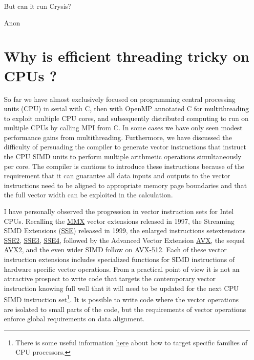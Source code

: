 \epigraph{But can it run Crysis?}{Anon}

\minitoc


\section{Why is efficient threading tricky on CPUs ?}

So far we have almost exclusively focused on programming central processing units (CPU) in serial with C, then with OpenMP annotated C for multithreading to exploit multiple CPU cores, and subsequently distributed computing to run on multiple CPUs by calling MPI from C. In some cases we have only seen modest performance gains from multithreading. Furthermore, we have discussed the difficulty of persuading the compiler to generate vector instructions that instruct the CPU SIMD units to perform multiple arithmetic operations simultaneously per core.  The compiler is cautious to introduce these instructions because of the requirement that it can guarantee all data inputs and outputs to the vector instructions need to be aligned to appropriate memory page boundaries and that the full vector width can be exploited in the calculation. 

I have personally observed the progression in vector instruction sets for Intel CPUs. Recalling the \href{https://en.wikipedia.org/wiki/MMX_(instruction_set)}{MMX} vector extensions released in 1997, the Streaming SIMD Extensions (\href{https://en.wikipedia.org/wiki/Streaming_SIMD_Extensions}{SSE}) released in 1999, the enlarged instructions setextensions \href{https://en.wikipedia.org/wiki/SSE2}{SSE2}, \href{https://en.wikipedia.org/wiki/SSE3}{SSE3}, \href{https://en.wikipedia.org/wiki/SSE4}{SSE4}, followed by the Advanced Vector Extension \href{https://en.wikipedia.org/wiki/Advanced_Vector_Extensions}{AVX}, the sequel \href{https://en.wikipedia.org/wiki/Advanced_Vector_Extensions}{AVX2}, and the even wider SIMD follow on \href{https://en.wikipedia.org/wiki/Advanced_Vector_Extensions}{AVX-512}. Each of these vector instruction extensions includes specialized functions for SIMD instructions of hardware specific vector operations. From a practical point of view it is not an attractive prospect to write code that targets the contemporary vector instruction knowing full well that it will need to be updated for the next CPU SIMD instruction set\footnote{There is some useful information \href{https://www.agner.org/optimize/}{here} about how to target specific families of CPU processors.}. It is possible to write code where the vector operations are isolated to small parts of the code, but the requirements of vector operations enforce global requirements on data alignment.

